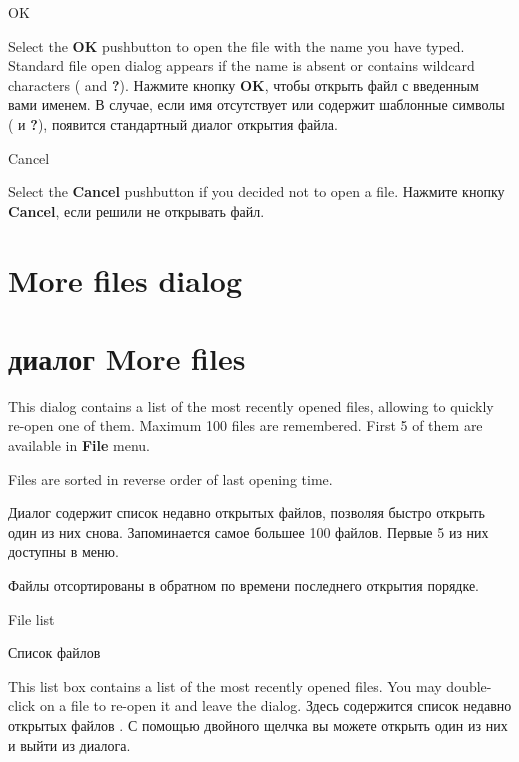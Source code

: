 \begin{popup}
\caption{OK}

\ifenglish
Select the {\bf OK} pushbutton to open the file with the name you have typed.
Standard file open dialog appears if the name is absent or contains wildcard
characters  ({\bf *} and {\bf ?}).
 \else
Нажмите кнопку {\bf OK}, чтобы открыть файл с введенным вами именем. 
В случае, если имя отсутствует или содержит шаблонные символы ({\bf *} и {\bf ?}), 
появится стандартный диалог открытия файла.
\fi
\end{popup}

\begin{popup}
\caption{Cancel}

\ifenglish
Select the {\bf Cancel} pushbutton if you decided not to open a file.
 \else
Нажмите кнопку {\bf Cancel}, если решили не открывать файл.
\fi
\end{popup}

\ifenglish
\section{More files dialog}
 \else
\section{диалог More files}
\fi
{}
\nominitoc

\ifenglish
This dialog contains a list of the most recently opened files, allowing
to quickly re-open one of them. Maximum 100 files are remembered. First 5 of them
are available in {\bf File} menu.

Files are sorted in reverse order of last opening time.

 \else
Диалог содержит список недавно открытых файлов, позволяя быстро открыть один
из них снова. Запоминается самое большее 100 файлов. Первые 5 из них
доступны в меню.

Файлы отсортированы в обратном по времени последнего открытия порядке.
\fi

\begin{popup}
\ifenglish
\caption{File list}
 \else
\caption{Список файлов}
\fi
{}

\ifenglish
This list box contains a list of the most recently opened files.
You may double-click on a file to re-open it and leave the dialog.
 \else
Здесь содержится список недавно открытых файлов .
С помощью двойного щелчка вы можете открыть один из них и выйти 
из диалога.
\fi
\end{popup}


